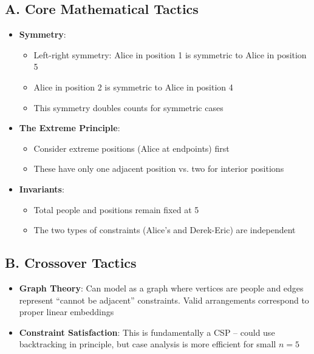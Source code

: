 \documentclass[]{article}
\begin{document}
\begin{tacticalbox}
\subsection*{A. Core Mathematical Tactics}
\begin{itemize}[leftmargin=*]
    \item \textbf{Symmetry}: 
    \begin{itemize}
        \item Left-right symmetry: Alice in position 1 is symmetric to Alice in position 5
        \item Alice in position 2 is symmetric to Alice in position 4
        \item This symmetry doubles counts for symmetric cases
    \end{itemize}
    
    \item \textbf{The Extreme Principle}: 
    \begin{itemize}
        \item Consider extreme positions (Alice at endpoints) first
        \item These have only one adjacent position vs. two for interior positions
    \end{itemize}
    
    \item \textbf{Invariants}: 
    \begin{itemize}
        \item Total people and positions remain fixed at 5
        \item The two types of constraints (Alice's and Derek-Eric) are independent
    \end{itemize}
\end{itemize}

\subsection*{B. Crossover Tactics}
\begin{itemize}[leftmargin=*]
    \item \textbf{Graph Theory}: Can model as a graph where vertices are people and edges represent ``cannot be adjacent'' constraints. Valid arrangements correspond to proper linear embeddings
    
    \item \textbf{Constraint Satisfaction}: This is fundamentally a CSP -- could use backtracking in principle, but case analysis is more efficient for small $n=5$
\end{itemize}
\end{tacticalbox}
\end{document}
